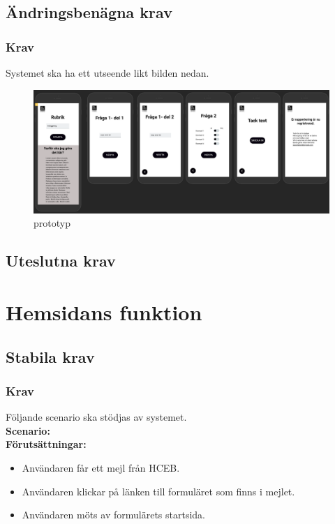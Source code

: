 \documentclass{article}
\begin{document}
    \subsection{Ändringsbenägna krav}
     \subsubsection{Krav}
    Systemet ska ha ett utseende likt bilden nedan.
    
    \begin{figure}[h!]
    \includegraphics[width=150mm]{prototyp.png}
     \caption{prototyp}
    \end{figure}
    \subsection{Uteslutna krav}
    
    \section{Hemsidans funktion}
    
    \subsection{Stabila krav}
       \subsubsection{Krav}
    Följande scenario ska stödjas av systemet.
        \\
       \indent \textbf{Scenario:}
        \\
       \indent \textbf{Förutsättningar:}
            \begin{itemize}
                \item  Användaren får ett mejl från HCEB.
                \item Användaren klickar på länken till formuläret som finns i mejlet.
                \item Användaren möts av formulärets startsida.
            \end{itemize}
            
\end{document}
